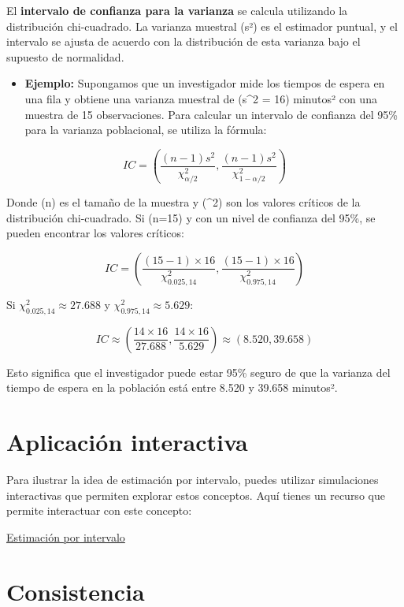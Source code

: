 \documentclass[
  letterpaper,
  DIV=11,
  numbers=noendperiod]{scrreprt}
\providecommand{\tightlist}{%
  \setlength{\itemsep}{0pt}\setlength{\parskip}{0pt}}\usepackage{longtable,booktabs,array}
\begin{document}
El \textbf{intervalo de confianza para la varianza} se calcula
utilizando la distribución chi-cuadrado. La varianza muestral (s²) es el
estimador puntual, y el intervalo se ajusta de acuerdo con la
distribución de esta varianza bajo el supuesto de normalidad.

\begin{itemize}
\tightlist
\item
  \textbf{Ejemplo:} Supongamos que un investigador mide los tiempos de
  espera en una fila y obtiene una varianza muestral de (s\^{}2 = 16)
  minutos² con una muestra de 15 observaciones. Para calcular un
  intervalo de confianza del 95\% para la varianza poblacional, se
  utiliza la fórmula:
\end{itemize}

\[ IC = \left(\frac{(n-1)s^2}{\chi^2_{\alpha/2}}, \frac{(n-1)s^2}{\chi^2_{1-\alpha/2}}\right) \]

Donde (n) es el tamaño de la muestra y (\chi\^{}2) son los valores
críticos de la distribución chi-cuadrado. Si (n=15) y con un nivel de
confianza del 95\%, se pueden encontrar los valores críticos:

\[ IC = \left(\frac{(15-1) \times 16}{\chi^2_{0.025, 14}}, \frac{(15-1) \times 16}{\chi^2_{0.975, 14}}\right) \]

Si \(\chi^2_{0.025, 14} \approx 27.688\) y
\(\chi^2_{0.975, 14} \approx 5.629\):

\[ IC \approx \left(\frac{14 \times 16}{27.688}, \frac{14 \times 16}{5.629}\right) \approx (8.520, 39.658) \]

Esto significa que el investigador puede estar 95\% seguro de que la
varianza del tiempo de espera en la población está entre 8.520 y 39.658
minutos².

\section{Aplicación interactiva}\label{aplicaciuxf3n-interactiva-1}

Para ilustrar la idea de estimación por intervalo, puedes utilizar
simulaciones interactivas que permiten explorar estos conceptos. Aquí
tienes un recurso que permite interactuar con este concepto:

\href{https://seeing-theory.brown.edu/frequentist-inference/}{Estimación
por intervalo}

\section{Consistencia}\label{consistencia-1}
\end{document}
